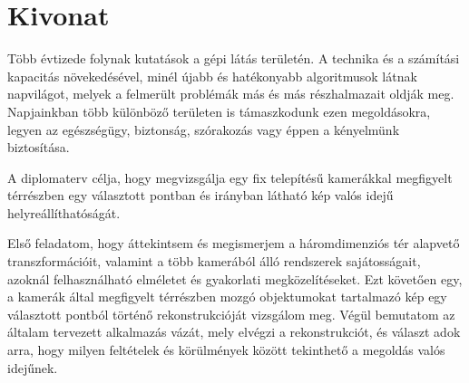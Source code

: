 \setcounter{page}{1}

\hungarianParagraph

\chapter*{Kivonat}

Több évtizede folynak kutatások a gépi látás területén. A technika és a számítási kapacitás növekedésével, minél újabb és hatékonyabb algoritmusok látnak napvilágot, melyek a felmerült problémák más és más részhalmazait oldják meg. Napjainkban több különböző területen is támaszkodunk ezen megoldásokra, legyen az egészségügy, biztonság, szórakozás vagy éppen a kényelmünk biztosítása.

A diplomaterv célja, hogy megvizsgálja egy fix telepítésű kamerákkal megfigyelt térrészben egy választott pontban és irányban látható kép valós idejű helyreállíthatóságát.

Első feladatom, hogy áttekintsem és megismerjem a háromdimenziós tér alapvető transzformációit, valamint a több kamerából álló rendszerek sajátosságait, azoknál felhasználható elméletet és gyakorlati megközelítéseket. Ezt követően egy, a kamerák által megfigyelt térrészben mozgó objektumokat tartalmazó kép egy választott pontból történő rekonstrukcióját vizsgálom meg. Végül bemutatom az általam tervezett alkalmazás vázát, mely elvégzi a rekonstrukciót, és választ adok arra, hogy milyen feltételek és körülmények között tekinthető a megoldás valós idejűnek.


\vfill








\dolgozatnyelve
{}

\setcounter{romanPage}{\value{page}}
